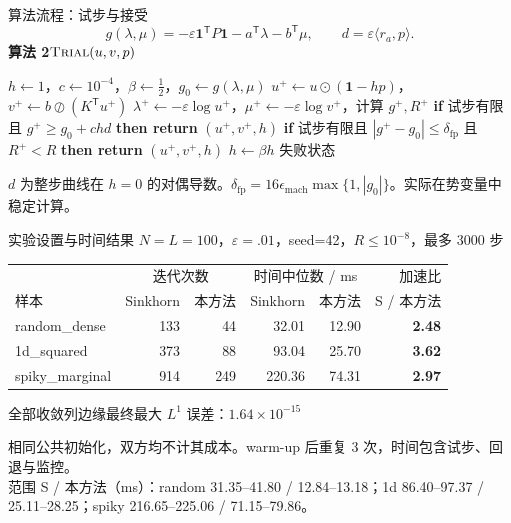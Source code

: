 \documentclass[aspectratio=169,11pt]{ctexbeamer}
\newcommand{\vone}{\bm{1}}
\newcommand{\trans}{\mathsf{T}}
\newcommand{\tagline}[1]{{\color{muted}\small #1}}
\newcommand{\source}[1]{\par\vfill{\color{muted}\fontsize{6.8}{9}\selectfont\raggedright #1\par}}
\newcommand{\algoheading}[1]{{\color{mainblue}\bfseries #1}\par\vspace{3pt}{\color{mainblue!35}\hrule height .4pt}\vspace{4pt}}
\begin{document}
\begin{frame}{算法流程：试步与接受}
\fontsize{9.3}{10.8}\selectfont
\[g(\lambda,\mu)=-\varepsilon\vone^{\trans}P\vone-a^{\trans}\lambda-b^{\trans}\mu,\qquad d=\varepsilon\langle r_a,p\rangle.\]
\algoheading{算法 2\quad $\Call{Trial}{u,v,p}$}
\begin{algorithmic}[1]
\State $h\gets1$，$c\gets10^{-4}$，$\beta\gets\tfrac12$，$g_0\gets g(\lambda,\mu)$
\If{$\vone-hp>0$}
\State $u^+\gets u\odot(\vone-hp)$，$v^+\gets b\oslash(K^{\trans}u^+)$
\State $\lambda^+\gets-\varepsilon\log u^+$，$\mu^+\gets-\varepsilon\log v^+$，计算 $g^+,R^+$
\State \textbf{if} 试步有限且 $g^+\geq g_0+chd$ \textbf{then return} $(u^+,v^+,h)$
\State \textbf{if} 试步有限且 $|g^+-g_0|\leq\delta_{\mathrm{fp}}$ 且 $R^+<R$
\State \hspace{1em}\textbf{then return} $(u^+,v^+,h)$
\EndIf
\State $h\gets\beta h$
\EndFor
\State \Return 失败状态
\end{algorithmic}
\source{$d$ 为整步曲线在 $h=0$ 的对偶导数。$\delta_{\mathrm{fp}}=16\epsilon_{\mathrm{mach}}\max\{1,|g_0|\}$。实际在势变量中稳定计算。}
\end{frame}

\begin{frame}{实验设置与时间结果}
\tagline{$N=L=100$，$\varepsilon=.01$，seed=42，$R\leq10^{-8}$，最多 3000 步}
\vspace{4mm}
\centering\small\renewcommand{\arraystretch}{1.45}
\begin{tabular*}{\textwidth}{@{\extracolsep{\fill}}lrrrrr@{}}
\toprule
&\multicolumn{2}{c}{迭代次数}&\multicolumn{2}{c}{时间中位数 / ms}&加速比\\
样本&Sinkhorn&本方法&Sinkhorn&本方法&S / 本方法\\
\midrule
random\_dense&133&44&32.01&12.90&\textcolor{accent}{\bfseries 2.48}\\
1d\_squared&373&88&93.04&25.70&\textcolor{accent}{\bfseries 3.62}\\
spiky\_marginal&914&249&220.36&74.31&\textcolor{accent}{\bfseries 2.97}\\
\bottomrule
\end{tabular*}
\par\vspace{4mm}\raggedright
全部收敛\hspace{8mm}列边缘最终最大 $L^1$ 误差：$1.64\times10^{-15}$
\source{相同公共初始化，双方均不计其成本。warm-up 后重复 3 次，时间包含试步、回退与监控。\\
范围 S / 本方法（ms）：random 31.35--41.80 / 12.84--13.18；1d 86.40--97.37 / 25.11--28.25；spiky 216.65--225.06 / 71.15--79.86。}
\end{frame}
\end{document}
